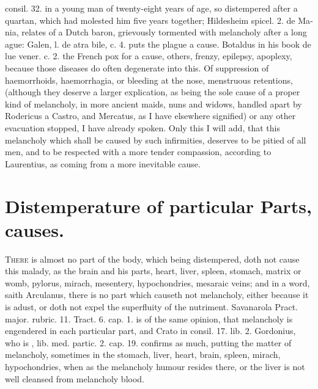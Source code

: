 {consil. 32. in a young man of twenty-eight years of age, so distempered
after a quartan, which had molested him five years together; \textlatin{Hildesheim
spicel. 2. de Mania}, relates of a Dutch baron, grievously tormented
with melancholy after a long ague: \textlatin{Galen, l. de atra bile, c. 4.}
puts the plague a cause. Botaldus in his book de lue vener. c. 2. the
French pox for a cause, others, frenzy, epilepsy, apoplexy, because
those diseases do often degenerate into this. Of suppression of
haemorrhoids, haemorrhagia, or bleeding at the nose, menstruous
retentions, (although they deserve a larger explication, as being the
sole cause of a proper kind of melancholy, in more ancient maids, nuns
and widows, handled apart by Rodericus a Castro, and Mercatus, as I
have elsewhere signified) or any other evacuation stopped, I have
already spoken. Only this I will add, that this melancholy which shall
be caused by such infirmities, deserves to be pitied of all men, and to
be respected with a more tender compassion, according to Laurentius, as
coming from a more inevitable cause.

\section{Distemperature of particular Parts, causes.}

\lettrine{T}{here} is almost no part of the body, which being distempered, doth not
cause this malady, as the brain and his parts, heart, liver, spleen,
stomach, matrix or womb, pylorus, mirach, mesentery, hypochondries,
mesaraic veins; and in a word, saith Arculanus, there is no part
which causeth not melancholy, either because it is adust, or doth not
expel the superfluity of the nutriment. Savanarola Pract. major.
rubric. 11. Tract. 6. cap. 1. is of the same opinion, that melancholy
is engendered in each particular part, and Crato in \textlatin{consil. 17.
lib. 2.} Gordonius, who is , \textlatin{lib. med. partic. 2. cap. 19.}
confirms as much, putting the matter of melancholy, sometimes in
the stomach, liver, heart, brain, spleen, mirach, hypochondries, when
as the melancholy humour resides there, or the liver is not well
cleansed from melancholy blood.

}
